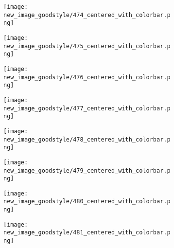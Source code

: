 \documentclass[a4paper,12pt]{article}
\begin{document}
\begin{figure}[H]
  \begin{subfigure}{0.11\textwidth}
    \texttt{[image: new\_image\_goodstyle/474\_centered\_with\_colorbar.png]}
  \end{subfigure}
  \hfill
  \begin{subfigure}{0.11\textwidth}
    \texttt{[image: new\_image\_goodstyle/475\_centered\_with\_colorbar.png]}
  \end{subfigure}
  \hfill
  \begin{subfigure}{0.11\textwidth}
    \texttt{[image: new\_image\_goodstyle/476\_centered\_with\_colorbar.png]}
  \end{subfigure}
  \hfill
  \begin{subfigure}{0.11\textwidth}
    \texttt{[image: new\_image\_goodstyle/477\_centered\_with\_colorbar.png]}
  \end{subfigure}
  \hfill
  \begin{subfigure}{0.11\textwidth}
    \texttt{[image: new\_image\_goodstyle/478\_centered\_with\_colorbar.png]}
  \end{subfigure}
  \hfill
  \begin{subfigure}{0.11\textwidth}
    \texttt{[image: new\_image\_goodstyle/479\_centered\_with\_colorbar.png]}
  \end{subfigure}
  \hfill
  \begin{subfigure}{0.11\textwidth}
    \texttt{[image: new\_image\_goodstyle/480\_centered\_with\_colorbar.png]}
  \end{subfigure}
  \hfill
  \begin{subfigure}{0.11\textwidth}
    \texttt{[image: new\_image\_goodstyle/481\_centered\_with\_colorbar.png]}
  \end{subfigure}
  \hfill
\end{figure}
\end{document}
